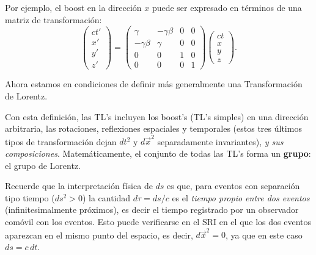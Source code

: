 \begin{center}
\end{center}
Por ejemplo, el boost en la dirección $x$ puede ser expresado en términos de una matriz de transformación:
\begin{equation}
 \left(\begin{array}{c} ct' \\ x' \\ y' \\z' \end{array}\right)=\left(
\begin{array}{cccc}
\gamma & -\gamma\beta & 0 &0 \\
-\gamma\beta & \gamma  & 0  & 0 \\
0 & 0 & 1  & 0 \\
0 & 0 & 0  & 1
\end{array}
\right)\left(\begin{array}{c} ct \\ x \\ y \\z \end{array}\right).
\end{equation}

Ahora estamos en condiciones de definir más generalmente una Transformación de Lorentz. 

\begin{quotation}
\end{quotation}


Con esta definición, las TL's incluyen los boost's (TL's simples) en una dirección arbitraria, las rotaciones, reflexiones espaciales y temporales (estos tres últimos tipos de transformación dejan $dt^2$ y $d\vec{x}^2$ separadamente invariantes), \textit{y sus composiciones}. Matemáticamente, el conjunto de todas las TL's forma un \textbf{grupo}: el grupo de Lorentz.

Recuerde que la interpretación física de $ds$ es que, para eventos con separación tipo tiempo ($ds^2>0$) la cantidad $d\tau=ds/c$ es el \textit{tiempo propio entre dos eventos} (infinitesimalmente próximos), es decir el tiempo registrado por un observador comóvil con los eventos. Esto puede verificarse en el SRI en el que los dos eventos aparezcan en el mismo punto del espacio, es decir, $d\vec{x}^2=0$, ya que en este caso $ds=c\,dt$.
